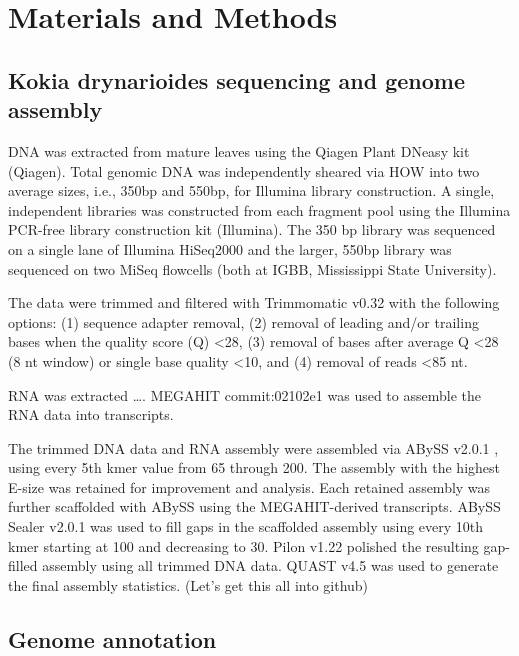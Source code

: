\documentclass[10pt,letterpaper]{article}
\begin{document}
\section*{Materials and Methods}
\subsection*{Kokia drynarioides sequencing and genome assembly}

DNA was extracted from mature leaves using the Qiagen Plant DNeasy kit (Qiagen).
Total genomic DNA was independently sheared via HOW into two average sizes,
i.e., 350bp and 550bp, for Illumina library construction. A single, independent
libraries was constructed from each fragment pool using the Illumina PCR-free
library construction kit (Illumina). The 350 bp library was sequenced on a
single lane of Illumina HiSeq2000 and the larger, 550bp library was sequenced on
two MiSeq flowcells (both at IGBB, Mississippi State University).

The data were trimmed and filtered with Trimmomatic v0.32 \cite{Bolger2014} with
the following options: (1) sequence adapter removal, (2) removal of leading
and/or trailing bases when the quality score (Q) \textless 28, (3) removal of
bases after average Q \textless 28 (8 nt window) or single base quality
\textless 10, and (4) removal of reads \textless 85 nt.

RNA was extracted \ldots. MEGAHIT commit:02102e1 \cite{Li2015} was used to assemble
the RNA data into transcripts.

The trimmed DNA data and RNA assembly were assembled via ABySS v2.0.1
\cite{Simpson2009}, using every 5th kmer value from 65 through 200. The assembly
with the highest E-size \cite{Salzberg2012} was retained for improvement and
analysis. Each retained assembly was further scaffolded with ABySS using the
MEGAHIT-derived transcripts. ABySS Sealer v2.0.1 \cite{Paulino2015} was used to
fill gaps in the scaffolded assembly using every 10th kmer starting at 100 and
decreasing to 30. Pilon v1.22 \cite{Walker2014} polished the resulting
gap-filled assembly using all trimmed DNA data. QUAST v4.5 \cite{Gurevich2013}
was used to generate the final assembly statistics. (Let's get this all into
github)


\subsection*{Genome annotation}
\end{document}
